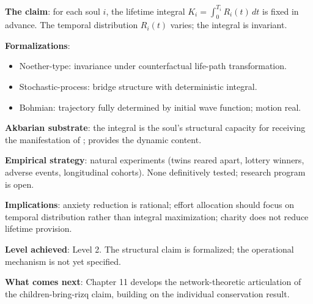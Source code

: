 \begin{summarybox}
\textbf{The claim}: for each soul $i$, the lifetime integral
$K_i = \int_0^{T_i} R_i(t)\, dt$ is fixed in advance. The temporal
distribution $R_i(t)$ varies; the integral is invariant.

\textbf{Formalizations}:
\begin{itemize}[leftmargin=1.5em]
    \item Noether-type: invariance under counterfactual life-path
    transformation.
    \item Stochastic-process: bridge structure with deterministic
    integral.
    \item Bohmian: trajectory fully determined by initial wave
    function; motion real.
\end{itemize}

\textbf{Akbarian substrate}: the integral is the soul's structural
capacity for receiving the manifestation of ;
 provides the dynamic content.

\textbf{Empirical strategy}: natural experiments (twins reared
apart, lottery winners, adverse events, longitudinal cohorts).
None definitively tested; research program is open.

\textbf{Implications}: anxiety reduction is rational; effort
allocation should focus on temporal distribution rather than
integral maximization; charity does not reduce lifetime provision.

\textbf{Level achieved}: Level 2. The structural claim is
formalized; the operational mechanism is not yet specified.

\textbf{What comes next}: Chapter 11 develops the network-theoretic
articulation of the children-bring-rizq claim, building on the
individual conservation result.
\end{summarybox}

\cleardoublepage
